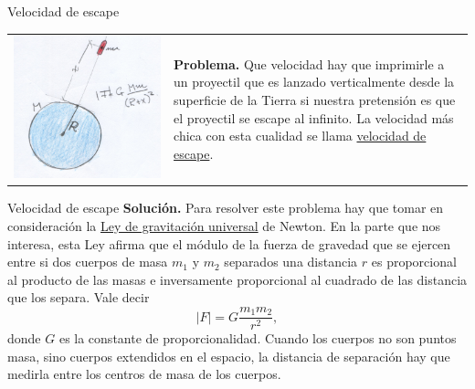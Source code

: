 \documentclass{article}
\begin{document}
{Velocidad de escape}\label{pag:vel_esc}

\begin{tabular}{m{4cm} m{5cm}}
 \includegraphics[scale=.075]{imagenes/tiro_vertical.jpg}&\textbf{Problema.} Que velocidad hay que imprimirle a un proyectil que es lanzado verticalmente desde la superficie de la Tierra si nuestra pretensión
es que el proyectil se escape al infinito. La velocidad más chica con esta cualidad se llama 
\href{http://es.wikipedia.org/wiki/Velocidad_de_escape}{velocidad de escape}.\\
\end{tabular}
 




{Velocidad de escape}
\textbf{Solución.} Para resolver este problema hay que tomar en consideración la 
\href{http://es.wikipedia.org/wiki/Ley_de_gravitación_universal}{Ley de gravitación universal} de Newton. En la parte que nos interesa, esta Ley afirma
que el módulo de la fuerza de gravedad que se ejercen entre si dos cuerpos de masa $m_1$ y $m_2$ separados una distancia $r$ es proporcional al producto de las masas  
e inversamente proporcional al cuadrado de las distancia que los separa. Vale decir
\[|F|=G\frac{m_1m_2}{r^2},\]
donde $G$ es la constante de proporcionalidad.
Cuando los cuerpos no son puntos masa, sino cuerpos extendidos en el espacio, la distancia de separación hay que medirla entre los centros de masa de los cuerpos. 
\end{document}
